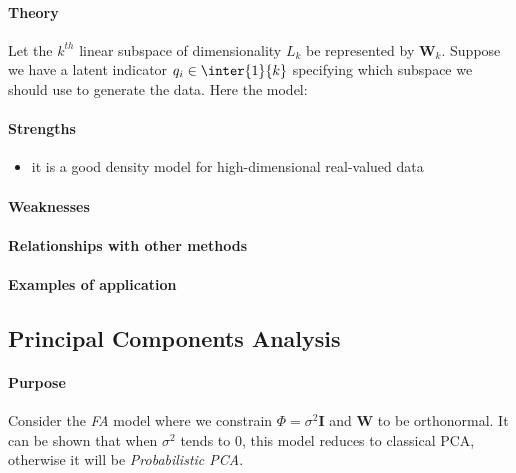 \paragraph{Theory}
Let the $k^{th}$ linear subspace of dimensionality $L_{k}$ be represented by $\bm{W}_{k}$.
Suppose we have a latent indicator $q_{i}\in\inter{1}{k}$ specifying which subspace we should use 
to generate the data. Here the model:
\begin{center}
\end{center}

\paragraph{Strengths}
\begin{itemize}
    \item it is a good density model for high-dimensional real-valued data
\end{itemize}

\paragraph{Weaknesses}
\paragraph{Relationships with other methods}
\paragraph{Examples of application}


\subsection{Principal Components Analysis}
\paragraph{Purpose}
Consider the \emph{FA} model where we constrain $\Phi = \sigma^{2}\bm{I}$ and $\bm{W}$
to be orthonormal. It can be shown that when $\sigma^{2}$ tends to 0, this model 
reduces to classical PCA, otherwise it will be \emph{Probabilistic PCA}.
